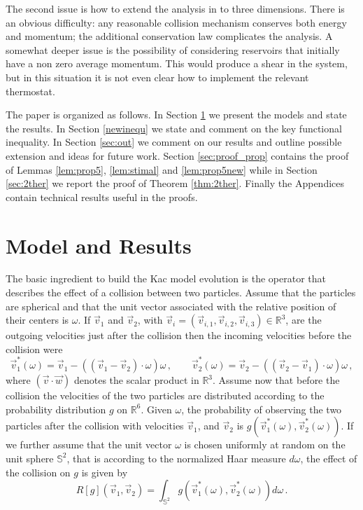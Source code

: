 \documentclass{article}
\def\red{}
\newcommand*\R{ \mathds{R} }
\newcommand\vv{{\vec v}}
\newcommand\vw{{\vec w}}
\begin{document}
The second issue is how to extend the analysis in \cite{BLTV} to three dimensions. There is an obvious difficulty: any
reasonable collision mechanism conserves both energy and momentum; the additional conservation law complicates the analysis.
A somewhat deeper issue is the possibility of considering reservoirs that initially have a non zero average momentum.
This would produce a shear in the system, but in this situation it is not even clear how to implement the relevant
thermostat.

The paper is organized as follows.  In Section \ref{modelandresults} we present the models and state the results.
In Section \ref{newinequ} we state and comment on the key functional inequality.
In Section \ref{sec:out} we comment on our results and outline possible
extension and ideas for future work. Section \ref{sec:proof_prop} contains the proof of Lemmas \ref{lem:prop5},
\ref{lem:stimal} and \ref{lem:prop5new} while in Section \ref{sec:2ther} we report the proof of Theorem \ref{thm:2ther}.
Finally the Appendices contain technical results useful in the proofs.



\section{Model and Results} \label{modelandresults}

The basic ingredient to build the Kac model evolution is the operator that describes the effect of a collision between
two particles. Assume that the particles are spherical and that the unit vector associated with the relative position of
their centers is $\omega$. If $\vec v_1$ and $\vec v_2$, with $\vec v_i=(\vec v_{i,1}, \vec v_{i,2},\vec v_{i,3})\in\R^3$,
are the outgoing velocities just after the collision then the incoming velocities before the collision were
\[
\vec v_1^*(\omega)=\vec v_1-((\vec v_1-\vec v_2)\cdot\omega)\omega\,,\qquad \vec v_2^*(\omega)=\vec
v_2-((\vec v_2-\vec v_1)\cdot\omega)\omega\, ,
\]
where $(\vv\cdot\vw)$ denotes the scalar product in $\mathds R^3$. \red{Assume now that before the collision the
velocities of the two particles are distributed according to the probability distribution $g$ on $\R^6$. Given
$\omega$, the probability of observing the two particles after the collision with velocities $\vec v_1$, and $\vec
v_2$ is $g(\vec v_1^*(\omega),\vec v_2^*(\omega))$. If we further assume that the unit vector $\omega$ is chosen 
uniformly  at random on the unit sphere $\mathds S^2$, that is according to the normalized Haar measure $d\omega$,
the effect of the collision on $g$ is given by}
\begin{equation}\label{eq:defR}
R[g](\vec v_1,\vec v_2)=\int_{\mathds S^2}g(\vec v_1^*(\omega),\vec v_2^*(\omega))d\omega\, .
\end{equation}
\end{document}

